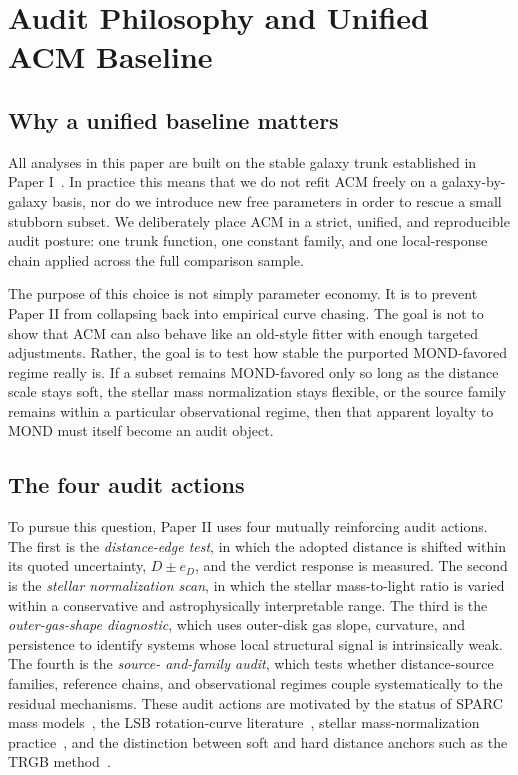 ﻿\documentclass[aps,prd,twocolumn,superscriptaddress,longbibliography,nofootinbib,floatfix,10pt]{revtex4-2}
\begin{document}
\section{Audit Philosophy and Unified ACM Baseline}

\subsection{Why a unified baseline matters}

All analyses in this paper are built on the stable galaxy trunk established in
Paper I~\cite{Liu2026PaperI}. In practice this means that we do not refit ACM
freely on a galaxy-by-galaxy basis, nor do we introduce new free parameters in
order to rescue a small stubborn subset. We deliberately place ACM in a strict,
unified, and reproducible audit posture: one trunk function, one constant
family, and one local-response chain applied across the full comparison sample.

The purpose of this choice is not simply parameter economy. It is to prevent
Paper II from collapsing back into empirical curve chasing. The goal is not to
show that ACM can also behave like an old-style fitter with enough targeted
adjustments. Rather, the goal is to test how stable the purported MOND-favored
regime really is. If a subset remains MOND-favored only so long as the distance
scale stays soft, the stellar mass normalization stays flexible, or the source
family remains within a particular observational regime, then that apparent
loyalty to MOND must itself become an audit object.

\subsection{The four audit actions}

To pursue this question, Paper II uses four mutually reinforcing audit actions.
The first is the \emph{distance-edge test}, in which the adopted distance is
shifted within its quoted uncertainty, $D \pm e_D$, and the verdict response is
measured. The second is the \emph{stellar normalization scan}, in which the
stellar mass-to-light ratio is varied within a conservative and astrophysically
interpretable range. The third is the \emph{outer-gas-shape diagnostic}, which
uses outer-disk gas slope, curvature, and persistence to identify systems whose
local structural signal is intrinsically weak. The fourth is the \emph{source-
and-family audit}, which tests whether distance-source families, reference
chains, and observational regimes couple systematically to the residual
mechanisms. These audit actions are motivated by the status of SPARC mass
models~\cite{LelliMcGaughSchombert2016SPARC}, the LSB rotation-curve
literature~\cite{McGaughRubinDeBlok2001}, stellar mass-normalization
practice~\cite{BellDeJong2001}, and the distinction between soft and hard
distance anchors such as the TRGB method~\cite{MadoreMagerFreedman2009}.
\end{document}

